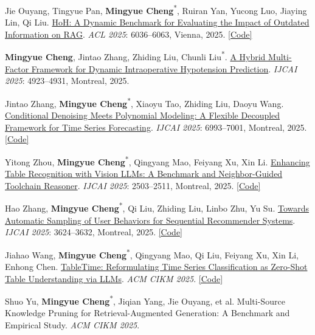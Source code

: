 \documentclass[UTF8,fontset=fandol,scheme=plain,11pt,a4paper]{ctexart}
\newcommand{\pubentry}[1]{\item \begin{minipage}[t]{\linewidth}#1\end{minipage}}
\begin{document}
\begin{publist}[start=31]
\pubentry{Jie Ouyang, Tingyue Pan, \textbf{Mingyue Cheng}\textsuperscript{*}, Ruiran Yan, Yucong Luo, Jiaying Lin, Qi Liu. \href{https://aclanthology.org/2025.acl-long.301.pdf}{HoH: A Dynamic Benchmark for Evaluating the Impact of Outdated Information on RAG}. \emph{ACL 2025}: 6036--6063, Vienna, 2025. \href{https://github.com/0russwest0/HoH}{[Code]}}

\pubentry{\textbf{Mingyue Cheng}, Jintao Zhang, Zhiding Liu, Chunli Liu\textsuperscript{*}. \href{https://www.arxiv.org/pdf/2409.11064}{A Hybrid Multi-Factor Framework for Dynamic Intraoperative Hypotension Prediction}. \emph{IJCAI 2025}: 4923--4931, Montreal, 2025.}

\pubentry{Jintao Zhang, \textbf{Mingyue Cheng}\textsuperscript{*}, Xiaoyu Tao, Zhiding Liu, Daoyu Wang. \href{https://arxiv.org/pdf/2410.13253}{Conditional Denoising Meets Polynomial Modeling: A Flexible Decoupled Framework for Time Series Forecasting}. \emph{IJCAI 2025}: 6993--7001, Montreal, 2025. \href{https://github.com/zjt-gpu/FDF}{[Code]}}

\pubentry{Yitong Zhou, \textbf{Mingyue Cheng}\textsuperscript{*}, Qingyang Mao, Feiyang Xu, Xin Li. \href{https://arxiv.org/abs/2412.20662}{Enhancing Table Recognition with Vision LLMs: A Benchmark and Neighbor-Guided Toolchain Reasoner}. \emph{IJCAI 2025}: 2503--2511, Montreal, 2025. \href{https://github.com/lqzxt/NGTR}{[Code]}}

\pubentry{Hao Zhang, \textbf{Mingyue Cheng}\textsuperscript{*}, Qi Liu, Zhiding Liu, Linbo Zhu, Yu Su. \href{https://arxiv.org/abs/2311.00388}{Towards Automatic Sampling of User Behaviors for Sequential Recommender Systems}. \emph{IJCAI 2025}: 3624--3632, Montreal, 2025. \href{https://github.com/zh-ustc/AutoSAM}{[Code]}}

\pubentry{Jiahao Wang, \textbf{Mingyue Cheng}\textsuperscript{*}, Qingyang Mao, Qi Liu, Feiyang Xu, Xin Li, Enhong Chen. \href{https://arxiv.org/pdf/2411.15737}{TableTime: Reformulating Time Series Classification as Zero-Shot Table Understanding via LLMs}. \emph{ACM CIKM 2025}. \href{https://github.com/realwangjiahao/TableTime}{[Code]}}

\pubentry{Shuo Yu, \textbf{Mingyue Cheng}\textsuperscript{*}, Jiqian Yang, Jie Ouyang, et al. Multi-Source Knowledge Pruning for Retrieval-Augmented Generation: A Benchmark and Empirical Study. \emph{ACM CIKM 2025}.}

\end{publist}
\end{document}
